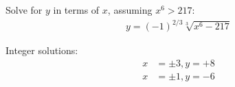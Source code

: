 Solve for $y$ in terms of $x$, assuming $x^{6}>217$:
\begin{align*}
y = (-1)^{2/3} \sqrt[3]{x^{6}-217}
\end{align*}

Integer solutions:
\begin{align*}
x & = \pm 3, y = +8
\\
x & = \pm 1, y = -6
\end{align*}
